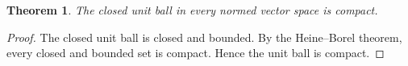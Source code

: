 \documentclass{article}
\newtheorem{theorem}{Theorem}
\begin{document}
\begin{theorem}\label{thm:unit-ball-compact}
The closed unit ball in every normed vector space is compact.
\end{theorem}
\begin{proof}
The closed unit ball is closed and bounded. By the Heine--Borel theorem,
every closed and bounded set is compact. Hence the unit ball is compact.
\end{proof}
\end{document}
